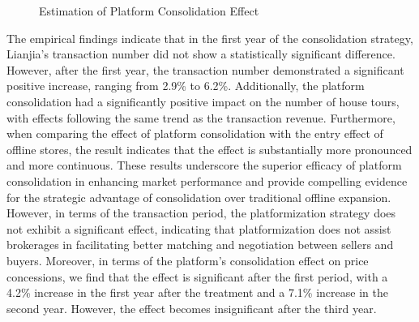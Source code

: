 \documentclass[11pt]{article}
\begin{document}
\begin{figure}[ht]
    \caption{Estimation of Platform Consolidation Effect}
    \label{fig:dynamic_effect}
\end{figure}

The empirical findings indicate that in the first year of the consolidation strategy, Lianjia's transaction number did not show a statistically significant difference. However, after the first year, the transaction number demonstrated a significant positive increase, ranging from 2.9\% to 6.2\%. Additionally, the platform consolidation had a significantly positive impact on the number of house tours, with effects following the same trend as the transaction revenue. Furthermore, when comparing the effect of platform consolidation with the entry effect of offline stores, the result indicates that the effect is substantially more pronounced and more continuous. These results underscore the superior efficacy of platform consolidation in enhancing market performance and provide compelling evidence for the strategic advantage of consolidation over traditional offline expansion. However, in terms of the transaction period, the platformization strategy does not exhibit a significant effect, indicating that platformization does not assist brokerages in facilitating better matching and negotiation between sellers and buyers. Moreover, in terms of the platform's consolidation effect on price concessions, we find that the effect is significant after the first period, with a 4.2\% increase in the first year after the treatment and a 7.1\% increase in the second year. However, the effect becomes insignificant after the third year. 
\end{document}

